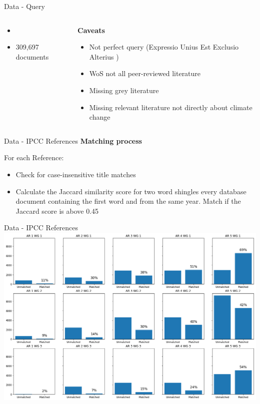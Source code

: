 \documentclass[9pt]{beamer}
\begin{document}
\begin{frame}{Data - Query}
\begin{columns}
\begin{column}{0.65\linewidth}
\normalsize
\begin{itemize}
\item \citep{Haunschild2016}
\item 309,697 documents
\end{itemize}
\end{column}
\begin{column}{0.35\linewidth}
\textbf{Caveats}
\begin{itemize}
\item Not perfect query (Expressio Unius Est Exclusio Alterius )
\item WoS not all peer-reviewed literature
\item Missing grey literature
\item Missing relevant literature not directly about climate change
\end{itemize}
\end{column}
\end{columns}
\end{frame}

\begin{frame}{Data - IPCC References}
\textbf{Matching process}

\medskip

For each Reference:
\begin{itemize}
\item Check for case-insensitive title matches
\item Calculate the Jaccard similarity score for two word shingles every database document containing the first word and from the same year. Match if the Jaccard score is above 0.45
\end{itemize}
\end{frame}


\begin{frame}{Data - IPCC References}
\includegraphics[width=\linewidth]{../plots/ipcc_matches}
\end{frame}
\end{document}

